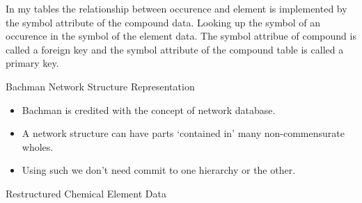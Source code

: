 \begin{frame} 
In my tables the relationship between occurence and element is implemented by the symbol attribute of the compound data.
Looking up the symbol of an occurence in the symbol of the element data.
The symbol attribue of compound is called a foreign key
and the symbol attribute of the compound table is called a primary key. 
\end{frame}

\begin{frame}{Bachman Network Structure Representation}
\begin{itemize}
	\item Bachman is credited with the concept of network database.
    \item A network structure can have parts `contained in' many non-commensurate wholes.
    \item Using such we don't need commit to one hierarchy or the other. 
 \end{itemize}
\end{frame}

\begin{frame}{Restructured Chemical Element Data}
\scalebox{0.75}{

}
\end{frame}

